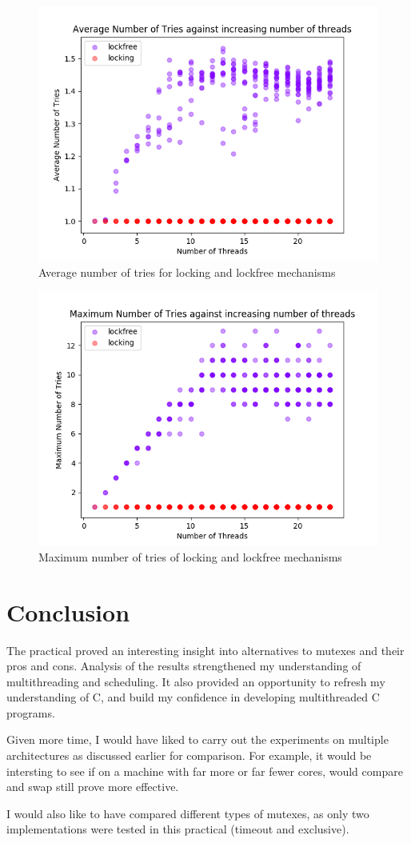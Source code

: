 \documentclass[12pt]{article}
\begin{document}
\begin{figure}[!ht]
  \centering
  \includegraphics[width=0.8\linewidth]{images/omittedavgtries}
	\caption{Average number of tries for locking and lockfree mechanisms}
  \label{fig:omittedavgtries}
\end{figure}

\begin{figure}[!ht]
  \centering
  \includegraphics[width=0.8\linewidth]{images/omittedmaxtries}
	\caption{Maximum number of tries of locking and lockfree mechanisms}
  \label{fig:omittedmaxtries}
\end{figure}

\part*{Conclusion}

The practical proved an interesting insight into alternatives to mutexes and their pros and cons. Analysis of the results strengthened my understanding of multithreading and scheduling. It also provided an opportunity to refresh my understanding of C, and build my confidence in developing multithreaded C programs.

Given more time, I would have liked to carry out the experiments on multiple architectures as discussed earlier for comparison. For example, it would be intersting to see if on a machine with far more or far fewer cores, would compare and swap still prove more effective. 

I would also like to have compared different types of mutexes, as only two implementations were tested in this practical (timeout and exclusive). 



\end{document}
